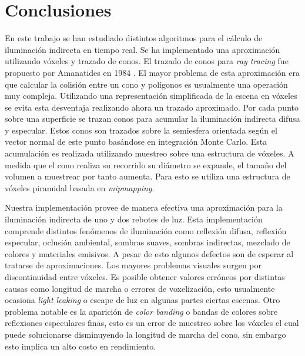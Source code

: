 \chapter{Conclusiones}
\label{chap:conclusion}
En este trabajo se han estudiado distintos algoritmos para el cálculo de iluminación indirecta en tiempo real. Se ha implementado una aproximación utilizando vóxeles y trazado de conos. El trazado de conos para \emph{ray tracing} fue propuesto por Amanatides en 1984 \cite{Amanatides:1984:RTC:800031.808589}. El mayor problema de esta aproximación era que calcular la colisión entre un cono y polígonos es usualmente una operación muy compleja. Utilizando una representación simplificada de la escena en vóxeles se evita esta desventaja realizando ahora un trazado aproximado. Por cada punto sobre una superficie se trazan conos para acumular la iluminación indirecta difusa y especular. Estos conos son trazados sobre la semiesfera orientada según el vector normal de este punto basándose en integración Monte Carlo. Esta acumulación es realizada utilizando muestreo sobre una estructura de vóxeles. A medida que el cono realiza su recorrido su diámetro se expande, el tamaño del volumen a muestrear por tanto aumenta. Para esto se utiliza una estructura de vóxeles piramidal basada en \emph{mipmapping}.

Nuestra implementación provee de manera efectiva una aproximación para la iluminación indirecta de uno y dos rebotes de luz. Esta implementación comprende distintos fenómenos de iluminación como reflexión difusa, reflexión especular, oclusión ambiental, sombras suaves, sombras indirectas, mezclado de colores y materiales emisivos. A pesar de esto algunos defectos son de esperar al tratarse de aproximaciones. Los mayores problemas visuales surgen por discontinuidad entre vóxeles. Es posible obtener valores erróneos por distintas causas como longitud de marcha o errores de voxelización, esto usualmente ocasiona \emph{light leaking} o escape de luz en algunas partes ciertas escenas. Otro problema notable es la aparición de \emph{color banding} o bandas de colores sobre reflexiones especulares finas, esto es un error de muestreo sobre los vóxeles el cual puede solucionarse disminuyendo la longitud de marcha del cono, sin embargo esto implica un alto costo en rendimiento.

